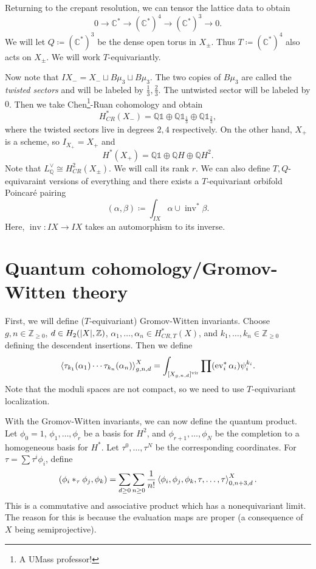 \documentclass[leqno, openany]{memoir}
\theoremstyle{definition}
\theoremstyle{remark}
\theoremstyle{plain}
\theoremstyle{definition}
\theoremstyle{remark}
\newcommand{\C}{\mathbb{C}}
\newcommand{\Z}{\mathbb{Z}}
\newcommand{\Q}{\mathbb{Q}}
\newcommand{\mr}[1]{\mathrm{#1}}
\newcommand{\on}[1]{\operatorname{#1}}
\begin{document}
Returning to the crepant resolution, we can tensor the lattice data to obtain
\[ 0 \to \C^* \to (\C^*)^4 \to (\C^*)^3 \to 0. \]
We will let $Q \coloneqq (\C^*)^3$ be the dense open torus in $X_{\pm}$. Thus $T \coloneqq (\C^*)^4$ also acts on $X_{\pm}$. We will work $T$-equivariantly.

Now note that $IX_- = X_- \sqcup B \mu_3 \sqcup B \mu_3$. The two copies of $B \mu_3$ are called the \textit{twisted sectors} and will be labeled by $\frac{1}{3}, \frac{2}{3}$. The untwisted sector will be labeled by $0$. Then we take Chen\footnote{A UMass professor!}-Ruan cohomology and obtain
\[ H^*_{CR}(X_-) = \Q \mathbb{1} \oplus \Q \mathbb{1}_{\frac{1}{3}} \oplus \Q \mathbb{1}_{\frac{2}{3}}, \]
where the twisted sectors live in degrees $2, 4$ respectively. On the other hand, $X_+$ is a scheme, so $I_{X_+} = X_+$ and
\[ H^*(X_+) = \Q \mathbb{1} \oplus \Q H \oplus \Q H^2. \]
Note that $L^{\vee}_{\Q} \cong H^2_{CR}(X_{\pm})$. We will call its rank $r$. We can also define $T, Q$-equivaraint versions of everything and there exists a $T$-equivariant orbifold Poincar\'e pairing
\[ (\alpha, \beta) \coloneqq \int_{IX} \alpha \cup \on{inv}^* \beta. \]
Here, $\on{inv} \colon IX \to IX$ takes an automorphism to its inverse.

\section{Quantum cohomology/Gromov-Witten theory}
First, we will define ($T$-equivariant) Gromov-Witten invariants. Choose $g, n \in \Z_{\geq 0}$, $d \in H_2(\abs{X}, \Z)$, $\alpha_1, \ldots, \alpha_n \in H^*_{CR, T}(X)$, and $k_1, \ldots, k_n \in \Z_{\geq 0}$ defining the descendent insertions. Then we define
\[ \ev{\tau_{k_1}(\alpha_1) \cdots \tau_{k_n}(\alpha_n)}^X_{g,n,d} = \int_{[X_{g,n,d}]^{\mr{vir}}} \prod (\on{ev}_i^* \alpha_i) \psi_i^{k_i}. \]
Note that the moduli spaces are not compact, so we need to use $T$-equivariant localization. 

With the Gromov-Witten invariants, we can now define the quantum product. Let $\phi_0 = 1$, $\phi_1, \ldots,\phi_r$ be a basis for $H^2$, and $\phi_{r+1}, \ldots, \phi_N$ be the completion to a homogeneous basis for $H^*$. Let $\tau^0, \ldots, \tau^N$ be the corresponding coordinates. For $\tau = \sum \tau^i \phi_i$, define
\[ (\phi_i *_{\tau} \phi_j, \phi_k) = \sum_{d \geq 0} \sum_{n \geq 0} \frac{1}{n!} \ev{\phi_i, \phi_j, \phi_k, \tau, \ldots, \tau}_{0,n+3, d}^X. \]
This is a commutative and associative product which has a nonequivariant limit. The reason for this is because the evaluation maps are proper (a consequence of $X$ being semiprojective).
\end{document}
